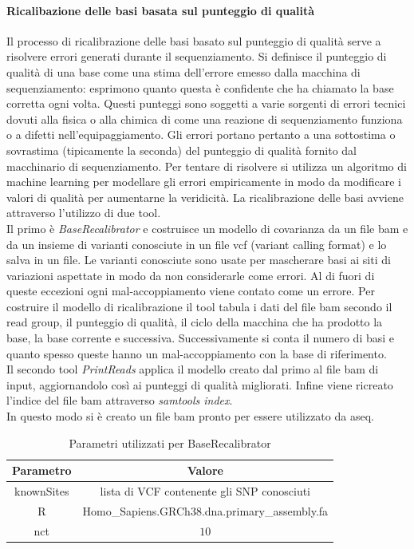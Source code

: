     \paragraph{Ricalibazione delle basi basata sul punteggio di qualit\`a}
    Il processo di ricalibrazione delle basi basato sul punteggio di qualit\`a serve a risolvere errori generati durante il sequenziamento.
    Si definisce il punteggio di qualit\`a di una base come una stima dell'errore emesso dalla macchina di sequenziamento: esprimono quanto questa \`e confidente che ha chiamato la base corretta ogni volta.
    Questi punteggi sono soggetti a varie sorgenti di errori tecnici dovuti alla fisica o alla chimica di come una reazione di sequenziamento funziona o a difetti nell'equipaggiamento.
    Gli errori portano pertanto a una sottostima o sovrastima (tipicamente la seconda) del punteggio di qualit\`a fornito dal macchinario di sequenziamento.
    Per tentare di risolvere si utilizza un algoritmo di machine learning per modellare gli errori empiricamente in modo da modificare i valori di qualit\`a per aumentarne la veridicit\`a.
    La ricalibrazione delle basi avviene attraverso l'utilizzo di due tool.\\
    Il primo \`e \emph{BaseRecalibrator} \cite{baserecalibrator} e costruisce un modello di covarianza da un file bam e da un insieme di varianti conosciute in un file vcf (variant calling format) e lo salva in un file.
    Le varianti conosciute sono usate per mascherare basi ai siti di variazioni aspettate in modo da non considerarle come errori.
    Al di fuori di queste eccezioni ogni mal-accoppiamento viene contato come un errore.
    Per costruire il modello di ricalibrazione il tool tabula i dati del file bam secondo il read group, il punteggio di qualit\`a, il ciclo della macchina che ha prodotto la base, la base corrente e successiva.
    Successivamente si conta il numero di basi e quanto spesso queste hanno un mal-accoppiamento con la base di riferimento.\\
    Il secondo tool \emph{PrintReads} \cite{printreads} applica il modello creato dal primo al file bam di input, aggiornandolo cos\`i ai punteggi di qualit\`a migliorati.
    Infine viene ricreato l'indice del file bam attraverso \emph{samtools index}.\\
    In questo modo si \`e creato un file bam pronto per essere utilizzato da aseq.
    \begin{table}[H]
        \centering
        \begin{tabular}{|c|c|}
                \hline
                Parametro & Valore\\
                \hline
                knownSites & lista di VCF contenente gli SNP conosciuti\\
                \hline
                R & Homo\_Sapiens.GRCh38.dna.primary\_assembly.fa\\
                \hline
                nct & $10$\\
                \hline
         \end{tabular}
         \caption{Parametri utilizzati per BaseRecalibrator}
    \end{table}

